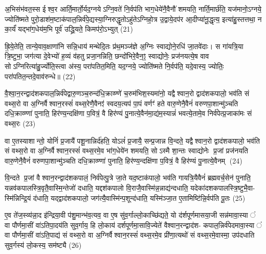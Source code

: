 अ॒भिसंभ॑वत॒स्स ईश्व॒र आर्ति॒मार्तो॒र्यद॒ग्नयेऽग्नि॒वते॑ नि॒र्वप॑ति भाग॒धेये॑नै॒वैनौ॑ शमयति॒ नार्ति॒मार्छ॑ति॒ यज॑मानो॒ऽग्नये॒ ज्योति॑ष्मते पुरो॒डाश॑म॒ष्टाक॑पाल॒न्निर्व॑पे॒द्यस्या॒ग्निरुद्धृ॒तोऽहु॑तेऽग्निहो॒त्र उ॒द्वाये॒दप॑र आ॒दीप्या॑नू॒द्धृत्य॒ इत्या॑हु॒स्तत्तथा॒ न का॒र्यं॑ यद्भा॑ग॒धेय॑म॒भि पूर्व॑ उद्ध्रि॒यते॒ किमप॑रो॒ऽभ्युत् (21)

ह्रि॒ये॒तेति॒ तान्ये॒वाव॒क्षाणा॑नि सन्नि॒धाय॑ मन्थेदि॒तः प्र॑थ॒मञ्ज॑ज्ञे अ॒ग्निः स्वाद्योने॒रधि॑ जा॒तवे॑दाः। स गा॑यत्रि॒या त्रि॒ष्टुभा॒ जग॑त्या दे॒वेभ्यो॑ ह॒व्यं व॑हतु प्रजा॒नन्निति॒ छन्दो॑भिरे॒वैन॒ꣵ॒ स्वाद्योनेः॒ प्रज॑नयत्ये॒ष वाव सोऽग्निरित्या॑हु॒र्ज्योति॒स्त्वा अ॑स्य॒ परा॑पतित॒मिति॒ यद॒ग्नये॒ ज्योति॑ष्मते नि॒र्वप॑ति॒ यदे॒वास्य॒ ज्योतिः॒ परा॑पतित॒न्तदे॒वाव॑रुन्धे॥ (22)

{\anuvakamend[{क॒रो॒त्य॒न्ना॒दो द॑धाति॒ यद॒ग्नये॒ शुच॑ये॒ चक्षु॑रे॒वास्मि॒न्तेन॑ दधाति करोति॒ वाजं॒ यज॑मान॒मुदे॒वास्य॒ षट्च॑॥४॥}]}

वै॒श्वा॒न॒रन्द्वाद॑शकपाल॒न्निर्व॑पेद्वारु॒णञ्च॒रुन्द॑धि॒क्राव्ण्णे॑ च॒रुम॑भिश॒स्यमा॑नो॒ यद्वैश्वान॒रो द्वाद॑शकपालो॒ भव॑ति सं वथ्स॒रो वा अ॒ग्निर्वैश्वान॒रस्सं॑ वथ्स॒रेणै॒वैनꣵ॑ स्वदय॒त्यप॑ पा॒पं वर्णꣳ॑ हते वारु॒णेनै॒वैनं॑ वरुणपा॒शान्मु॑ञ्चति दधि॒क्राव्ण्णा॑ पुनाति॒ हिर॑ण्य॒न्दक्षि॑णा प॒वित्रं॒ वै हिर॑ण्यं पु॒नात्ये॒वैन॑मा॒द्य॑म॒स्यान्नं॑ भवत्ये॒तामे॒व निर्व॑पेत्प्र॒जाका॑मः सं वथ्स॒रः (23)

वा ए॒तस्याशान्तो॒ योनिं॑ प्र॒जायै॑ पशू॒नान्निर्द॑हति॒ योऽलं॑ प्र॒जायै॒ सन्प्र॒जान्न वि॒न्दते॒ यद्वैश्वान॒रो द्वाद॑शकपालो॒ भव॑ति सं वथ्स॒रो वा अ॒ग्निर्वैश्वान॒रस्सं॑ वथ्स॒रमे॒व भा॑ग॒धेये॑न शमयति॒ सोऽस्मै शा॒न्तः स्वाद्योनेः प्र॒जां प्रज॑नयति वारु॒णेनै॒वैनं॑ वरुणपा॒शान्मु॑ञ्चति दधि॒क्राव्ण्णा॑ पुनाति॒ हिर॑ण्य॒न्दक्षि॑णा प॒वित्रं॒ वै हिर॑ण्यं पु॒नात्ये॒वैनम् (24)

वि॒न्दते प्र॒जां वैश्वान॒रन्द्वाद॑शकपालं॒ निर्व॑पेत्पु॒त्रे जा॒ते यद॒ष्टाक॑पालो॒ भव॑ति गायत्रि॒यैवैनं॑ ब्रह्मवर्च॒सेन॑ पुनाति॒ यन्नव॑कपालस्त्रि॒वृतै॒वास्मि॒न्तेजो॑ दधाति॒ यद्दश॑कपालो वि॒राजै॒वास्मि॑न्न॒न्नाद्य॑न्दधाति॒ यदेका॑दशकपालस्त्रि॒ष्टुभै॒वा- स्मि॑न्निन्द्रि॒यं द॑धाति॒ यद्द्वाद॑शकपालो॒ जग॑त्यै॒वास्मि॑न्प॒शून्द॑धाति॒ यस्मि॑ञ्जा॒त ए॒तामिष्टि॑न्नि॒र्वप॑ति पू॒तः (25)

ए॒व ते॑ज॒स्व्य॑न्ना॒द इ॑न्द्रिया॒वी प॑शु॒मान्भ॑व॒त्यव॒ वा ए॒ष सु॑व॒र्गाल्लो॒काच्छि॑द्यते॒ यो द॑र्\mbox{}शपूर्णमासया॒जी सन्न॑मावा॒स्यां वा पौर्णमा॒सीं वा॑ऽतिपा॒दय॑ति सुव॒र्गाय॒ हि लो॒काय॑ दर्\mbox{}शपूर्णमा॒सावि॒ज्येते॑ वैश्वान॒रन्द्वाद॑श- कपाल॒न्निर्व॑पेदमावा॒स्यां वा पौर्णमा॒सीं वा॑ऽति॒पाद्य॑ सं वथ्स॒रो वा अ॒ग्निर्वैश्वान॒रस्सं॑ वथ्स॒रमे॒व प्री॑णा॒त्यथो॑ सं वथ्स॒रमे॒वास्मा॒ उप॑दधाति सुव॒र्गस्य॑ लो॒कस्य॒ सम॑ष्ट्यै (26)

